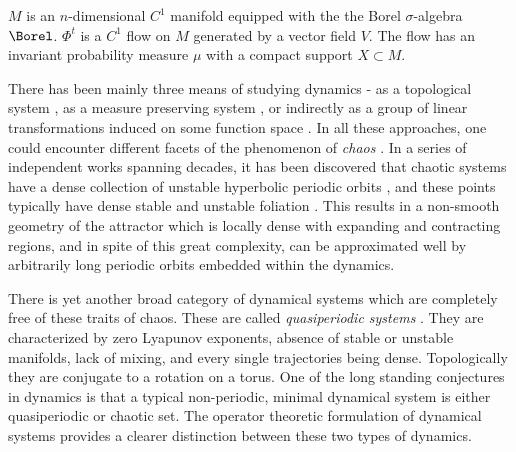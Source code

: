 \documentclass[12pt,oneside]{article}
\begin{document}
\begin{Assumption}\label{A:A1}
	$M$ is an $n$-dimensional $C^1$ manifold equipped with the the Borel $\sigma$-algebra $\Borel$. $\Phi^t$ is a $C^1$ flow on $M$ generated by a vector field $V$. The flow has an invariant probability measure $\mu$ with a compact support $X\subset M$.
\end{Assumption}

There has been mainly three means of studying dynamics - as a topological system \citep[][e.g.]{AkinEtAl1996, Blender2, DasJim17_chaos}, as a measure preserving system  \citep[][e.g.]{Halmos1944mixing, Halmos1944, Halmos1956, Walters2000}, or indirectly as a group of linear transformations induced on some function space \citep[][e.g.]{Nadkarni, DasGiannakis_RKHS_2018}. In all these approaches, one could encounter different facets of the phenomenon of \emph{chaos} \citep[][e.g.]{DGJ_compactV_2018, Katok_periodic_1980, Bowen_AxiomAflow_1975, Bowen_equi_1975, Robinson1998, Bowen_entropy_1970}. In a series of independent works spanning decades, it has been discovered that chaotic systems have a dense collection of unstable hyperbolic periodic orbits \citep[][e.g.]{Katok_periodic_1980}, and these points typically have dense stable and unstable foliation \citep[][e.g.]{Pesin_families_1976}. This results in a non-smooth geometry of the attractor which is locally dense with expanding and contracting regions, and in spite of this great complexity, can be approximated well by arbitrarily long periodic orbits \citep[][e.g.]{WangSun2010, LiaoEtAl2018} embedded within the dynamics.

There is yet another broad category of dynamical systems which are completely free of these traits of chaos. These are called \emph{quasiperiodic systems} \citep[][e.g.]{Dioph_Herman_1979, DasJim2017_SuperC, DSSY2017_QQ}. They are characterized by zero Lyapunov exponents, absence of stable or unstable manifolds, lack of mixing, and every single trajectories being dense. Topologically they are conjugate to a rotation on a torus. One of the long standing conjectures in dynamics  \cite{SanderYorkeChaos2015} is that a typical non-periodic, minimal dynamical system is either quasiperiodic or chaotic set. The operator theoretic formulation of dynamical systems provides a clearer distinction between these two types of dynamics.
\end{document}
